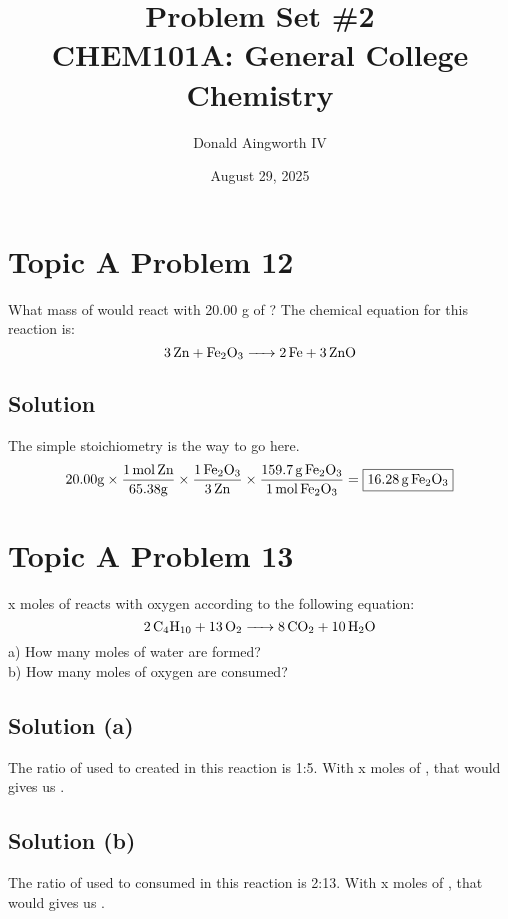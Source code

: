 \documentclass[10pt]{article}
\title{
    Problem Set \#2
    \\  \small
    CHEM101A: General College Chemistry
    }
\author{Donald Aingworth IV}
\date{August 29, 2025}
\begin{document}
    \maketitle

    \pagebreak
    \section{Topic A Problem 12}
        What mass of  would react with 20.00 g of ? 
        The chemical equation for this reaction is: 
        \begin{equation}
            \ce{3Zn + Fe2O3 -> 2Fe + 3ZnO}
        \end{equation}

        \subsection{Solution}
            The simple stoichiometry is the way to go here.
            \begin{equation}
                20.00 \unit{\gram} \times \frac{1\,\unit{\mole}\,\ce{Zn}}{65.38 \unit{\gram}} \times \frac{1\,\ce{Fe2O3}}{3\,\ce{Zn}} \times \frac{159.7\,\unit{\gram}\,\ce{Fe2O3}}{1\,\unit{\mole}\,\ce{Fe2O3}}  =   \boxed{16.28\,\unit{\gram}\,\ce{Fe2O3}}
            \end{equation}
            
    \pagebreak
    \section{Topic A Problem 13}
        x moles of  reacts with oxygen according to the following equation: 
        \begin{equation}
            \ce{2C4H10 + 13O2 -> 8CO2 + 10H2O}
        \end{equation}
        a) How many moles of water are formed?\\
        b) How many moles of oxygen are consumed?

        \subsection{Solution (a)}
            The ratio of  used to  created in this reaction is 1:5.
            With x moles of , that would gives us .

        \subsection{Solution (b)}
            The ratio of  used to  consumed in this reaction is 2:13.
            With x moles of , that would gives us .
\end{document}

